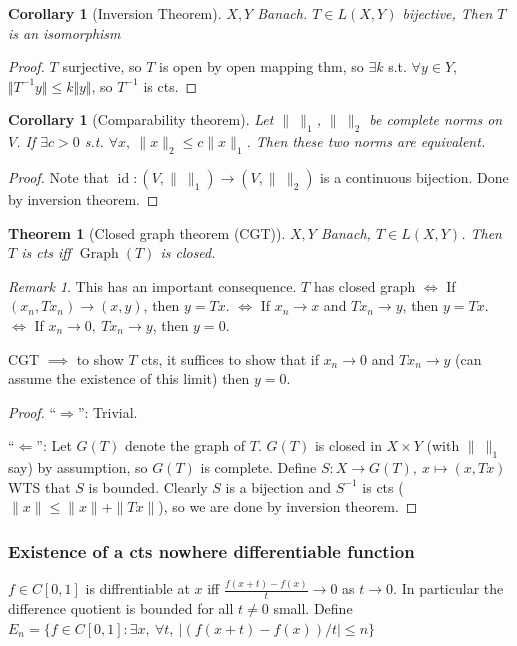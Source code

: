 \documentclass{article}
\theoremstyle{definition}
\theoremstyle{remark}
\newtheorem{rem}{Remark}
\theoremstyle{plain}
\newtheorem{thm}[defn]{Theorem}
\newtheorem{crly}[defn]{Corollary}
\newcommand{\id}{\operatorname{id}}
\begin{document}
\begin{crly}[Inversion Theorem]
    $X,Y$ Banach. $T\in L(X,Y)$ bijective, Then $T$ is an isomorphism
\end{crly}
\begin{proof}
    $T$ surjective, so $T$ is open by open mapping thm, so $\exists k$ s.t. $\forall y\in Y$, $\Vert T^{-1}y\Vert\le k\Vert y\Vert$, so $T^{-1}$ is cts.
\end{proof}
\begin{crly}[Comparability theorem]
    Let $\|\ \|_1$, $\|\ \|_2$ be complete norms on $V$. If $\exists c>0$ s.t. $\forall x,\ \|x\|_2\le c\|x\|_1$. Then these two norms are equivalent.
\end{crly}
\begin{proof}
    Note that $\id:(V,\|\ \|_1)\to(V,\|\ \|_2)$ is a continuous bijection. Done by inversion theorem.
\end{proof}
\begin{thm}[Closed graph theorem (CGT)]
    $X,Y$ Banach, $T\in L(X,Y)$. Then $T$ is cts iff $\operatorname{Graph}(T)$ is closed.
\end{thm}
\begin{rem}
    This has an important consequence. $T$ has closed graph $\Leftrightarrow$ If $(x_n,Tx_n)\to (x,y)$, then $y=Tx$. $\Leftrightarrow$ If $x_n\to x$ and $Tx_n\to y$, then $y=Tx$. $\Leftrightarrow$ If $x_n\to 0,\ Tx_n\to y$, then $y=0$.

    CGT $\implies$ to show $T$ cts, it suffices to show that if $x_n\to 0$ and $Tx_n\to y$ (can assume the existence of this limit) then $y=0$.
\end{rem}
\begin{proof}
    ``$\Rightarrow$'': Trivial.

    ``$\Leftarrow$'': Let $G(T)$ denote the graph of $T$. $G(T)$ is closed in $X\times Y$ (with $\|\ \|_1$ say) by assumption, so $G(T)$ is complete. Define $S:X\to G(T),\ x\mapsto (x,Tx)$ WTS that $S$ is bounded. Clearly $S$ is a bijection and $S^{-1}$ is cts ($\|x\|\le \|x\|+\|Tx\|$), so we are done by inversion theorem.
\end{proof}
\subsubsection{Existence of a cts nowhere differentiable function}
$f\in C[0,1]$ is diffrentiable at $x$ iff $\frac{f(x+t)-f(x)}{t}\to 0$ as $t\to 0$. In particular the difference quotient is bounded for all $t\neq 0$ small. Define $E_n=\{f\in C[0,1]:\exists x,\ \forall t,\ |(f(x+t)-f(x))/t|\le n\}$
\end{document}
